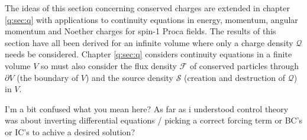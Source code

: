 The ideas of this section concerning conserved charges are extended in chapter \ref{q:sec:q} with applications to continuity equations in energy, momentum, angular momentum and Noether charges for spin-1 Proca fields. The results of this section have all been derived for an infinite volume where only a charge density $\mathcal{Q}$ needs be considered. Chapter \ref{q:sec:q} considers continuity equations in a finite volume $V$ so must also consider the flux density $\mathcal{F}$ of conserved particles through $\partial V$ (the boundary of $V$) and the source density $\mathcal{S}$ (creation and destruction of $\mathcal{Q}$) in $V$.

\color{choral} I'm a bit confused what you mean here? As far as i understood control theory was about inverting differential equations / picking a correct forcing term or BC's or IC's to achive a desired solution? \color{black}


